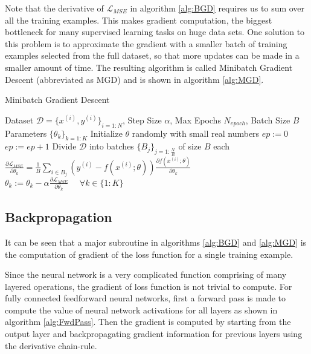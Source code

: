 Note that the derivative of $\mathcal{L}_{MSE}$ in algorithm \ref{alg:BGD} requires us to sum over all the training examples.
This makes gradient computation, the biggest bottleneck for many supervised learning tasks on huge data sets.
One solution to this problem is to approximate the gradient with a smaller batch of training examples selected from the full dataset, so that more updates can be made in a smaller amount of time.
The resulting algorithm is called Minibatch Gradient Descent (abbreviated as MGD) and is shown in algorithm \ref{alg:MGD}.
\begin{algorithm}[tb]
   \caption{Minibatch Gradient Descent}
   \label{alg:MGD}
\begin{algorithmic}
    Dataset $\mathcal{D} = \{x^{(i)},y^{(i)}\}_{i=1:N}$, Step Size $\alpha$, Max Epochs $N_{epoch}$, Batch Size $B$
    Parameters $\{\theta_k\}_{k=1:K}$
   \STATE
   \STATE Initialize $\theta$ randomly with small real numbers
   \STATE $ep := 0$
   \REPEAT
   \STATE $ep := ep + 1$
   \STATE Divide $\mathcal{D}$ into batches $\{B_j\}_{j=1:\frac{N}{B}}$ of size $B$ each
   \STATE $\frac{\partial \mathcal{L}_{MSE}}{\partial \theta_k} = \frac{1}{B} \sum_{i \in B_j} ( y^{(i)} - f(x^{(i)}; \theta)) \frac{\partial f(x^{(i)}; \theta)}{\partial \theta_k}$
   \ENDFOR
   \STATE $\theta_k := \theta_k - \alpha \frac{\partial \mathcal{L}_{MSE}}{\partial \theta_k} \hspace{16pt} \forall k \in \{1:K\}$
   \ENDFOR
\end{algorithmic}
\end{algorithm}

\subsection{Backpropagation}
\label{sub:BackProp}

It can be seen that a major subroutine in algorithms \ref{alg:BGD} and \ref{alg:MGD} is the computation of gradient of the loss function for a single training example.

Since the neural network is a very complicated function comprising of many layered operations, the gradient of loss function is not trivial to compute.
For fully connected feedforward neural networks, first a forward pass is made to compute the value of neural network activations for all layers as shown in algorithm \ref{alg:FwdPass}. Then the gradient is computed by starting from the output layer and backpropagating gradient information for previous layers using the derivative chain-rule.

